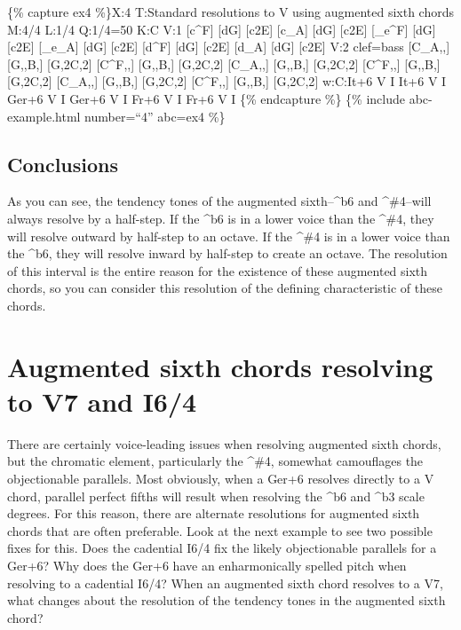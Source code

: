 \documentclass{book}
\begin{document}
\{\% capture ex4 \%\}X:4 T:Standard resolutions to V using augmented sixth
chords M:4/4 L:1/4 Q:1/4=50 K:C V:1 {[}c\^{}F{]} {[}dG{]} {[}c2E{]}\textbar{}
{[}c\_A{]} {[}dG{]} {[}c2E{]}\textbar\textbar{} {[}\_e\^{}F{]} {[}dG{]}
{[}c2E{]}\textbar{} {[}\_e\_A{]} {[}dG{]} {[}c2E{]}\textbar\textbar{}
{[}d\^{}F{]} {[}dG{]} {[}c2E{]}\textbar{} {[}d\_A{]} {[}dG{]}
{[}c2E{]}\textbar{]} V:2 clef=bass {[}C\_A,,{]} {[}G,,B,{]}
{[}G,2C,2{]}\textbar{} {[}C\^{}F,,{]} {[}G,,B,{]}
{[}G,2C,2{]}\textbar\textbar{} {[}C\_A,,{]} {[}G,,B,{]} {[}G,2C,2{]}\textbar{}
{[}C\^{}F,,{]} {[}G,,B,{]} {[}G,2C,2{]}\textbar\textbar{} {[}C\_A,,{]}
{[}G,,B,{]} {[}G,2C,2{]}\textbar{} {[}C\^{}F,,{]} {[}G,,B,{]}
{[}G,2C,2{]}\textbar{]} w:C:It+6 V I It+6 V I Ger+6 V I Ger+6 V I Fr+6 V I
Fr+6 V I \{\% endcapture \%\} \{\% include abc-example.html number=``4''
abc=ex4 \%\}

\hypertarget{conclusions-5}{%
\subsection{Conclusions}\label{conclusions-5}}

As you can see, the tendency tones of the augmented sixth--\^{}b6 and
\^{}\#4--will always resolve by a half-step. If the \^{}b6 is in a lower voice
than the \^{}\#4, they will resolve outward by half-step to an octave. If the
\^{}\#4 is in a lower voice than the \^{}b6, they will resolve inward by
half-step to create an octave. The resolution of this interval is the entire
reason for the existence of these augmented sixth chords, so you can consider
this resolution of the defining characteristic of these chords.

\hypertarget{augmented-sixth-chords-resolving-to-v7-and-i64}{%
\section{Augmented sixth chords resolving to V7 and
I6/4}\label{augmented-sixth-chords-resolving-to-v7-and-i64}}

There are certainly voice-leading issues when resolving augmented sixth
chords, but the chromatic element, particularly the \^{}\#4, somewhat
camouflages the objectionable parallels. Most obviously, when a Ger+6 resolves
directly to a V chord, parallel perfect fifths will result when resolving the
\^{}b6 and \^{}b3 scale degrees. For this reason, there are alternate
resolutions for augmented sixth chords that are often preferable. Look at the
next example to see two possible fixes for this. Does the cadential I6/4 fix
the likely objectionable parallels for a Ger+6? Why does the Ger+6 have an
enharmonically spelled pitch when resolving to a cadential I6/4? When an
augmented sixth chord resolves to a V7, what changes about the resolution of
the tendency tones in the augmented sixth chord?
\end{document}
